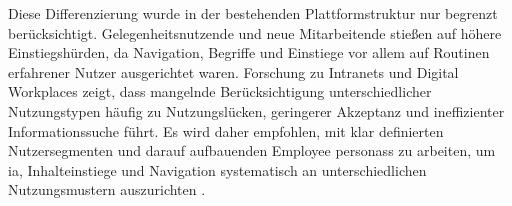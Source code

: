 Diese Differenzierung wurde in der bestehenden Plattformstruktur nur begrenzt berücksichtigt. Gelegenheitsnutzende und neue Mitarbeitende stießen auf höhere Einstiegshürden, da Navigation, Begriffe und Einstiege vor allem auf Routinen erfahrener Nutzer ausgerichtet waren. Forschung zu Intranets und Digital Workplaces zeigt, dass mangelnde Berücksichtigung unterschiedlicher Nutzungstypen häufig zu Nutzungslücken, geringerer Akzeptanz und ineffizienter Informationssuche führt. Es wird daher empfohlen, mit klar definierten Nutzersegmenten und darauf aufbauenden Employee \Glspl{personas} zu arbeiten, um \Gls{ia}, Inhalteinstiege und Navigation systematisch an unterschiedlichen Nutzungsmustern auszurichten \cite{113:NNGIntranetGuidelines,308:DWGSegmentation,112:StepTwoPersonas}.
